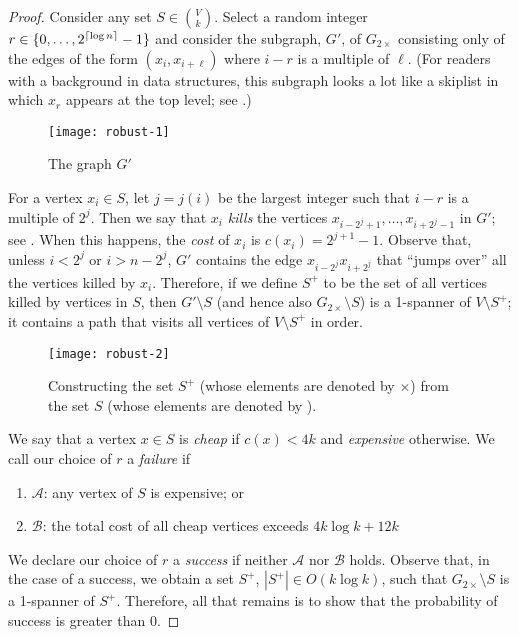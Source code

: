 \documentclass{patmorin}
\begin{document}
\begin{proof}
  Consider any set $S\in\binom{V}{k}$.  Select a random integer
  $r\in\{0,\ldots,2^{{\lceil \log n \rceil}}-1\}$ and consider the subgraph,
  $G'$, of $G_{2\times}$ consisting only of the edges of the form
  $(x_i,x_{i+\ell})$ where $i-r$ is a multiple of $\ell$.  (For readers
  with a background in data structures, this subgraph looks a lot like a
  skiplist in which $x_r$ appears at the top level; see .)

  \begin{figure}
    \begin{center}
      \texttt{[image: robust-1]}
    \end{center}
    \caption{The graph $G'$}
  \end{figure}

  For a vertex $x_i\in S$, let $j=j(i)$ be the largest integer such that
  $i-r$ is a multiple of $2^j$.  Then we say that $x_i$ \emph{kills}
  the vertices $x_{i-2^{j}+1},\ldots,x_{i+2^{j}-1}$ in $G'$; see
  .  When this happens, the \emph{cost} of $x_i$ is
  $c(x_i)=2^{j+1}-1$.  Observe that, unless $i<2^{j}$ or $i>n-2^{j}$, $G'$
  contains the edge $x_{i-2^{j}}x_{i+2^{j}}$ that ``jumps over'' all the
  vertices killed by $x_i$.  Therefore, if we define $S^+$ to be the set
  of all vertices killed by vertices in $S$, then $G'\setminus S$ (and
  hence also $G_{2\times}\setminus S$) is a 1-spanner of $V\setminus S^+$;
  it contains a path that visits all vertices of $V\setminus S^+$ in order.
  
  \begin{figure}
    \begin{center}
      \texttt{[image: robust-2]}
    \end{center}
    \caption{Constructing the set $S^+$ (whose elements are denoted
    by $\times$)
      from the set $S$ (whose elements are denoted by \textbullet).}
  \end{figure}
  
  We say that a vertex $x\in S$ is \emph{cheap} if $c(x) < 4k$ and
  \emph{expensive} otherwise.  We call our choice of $r$ a \emph{failure}
  if
  \begin{enumerate}
    \item $\mathcal{A}$: any vertex of $S$ is expensive; or
    \item $\mathcal{B}$: the total cost of all cheap vertices exceeds
      $4k\log k+12k$
  \end{enumerate}
  We declare our choice of $r$ a \emph{success} if neither $\mathcal{A}$
  nor $\mathcal{B}$ holds.  Observe that, in the case of a success, we
  obtain a set $S^+$, $|S^+|\in O(k\log k)$, such that $G_{2\times}\setminus
  S$ is a 1-spanner of $S^+$.  Therefore, all that remains is to show that the
  probability of success is greater than 0.
  

\end{proof}
\end{document}

